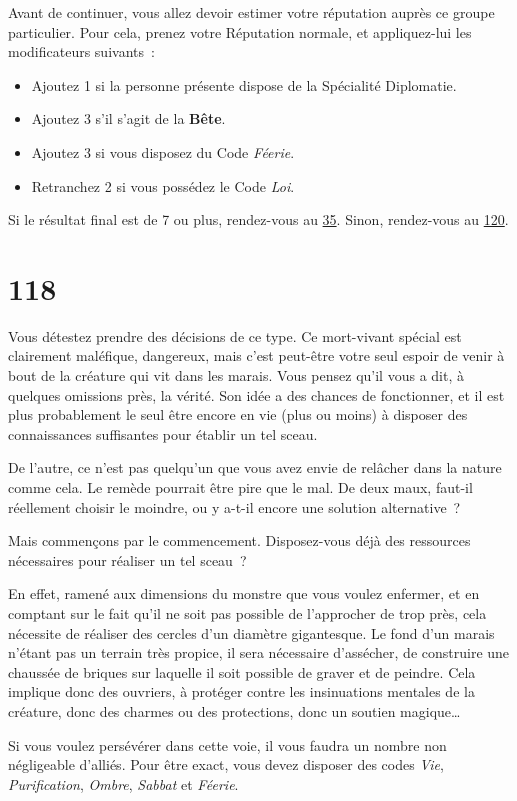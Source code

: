 \documentclass{report}
\newcommand{\gsection}[1]{
    \section{#1}
    \label{section-#1}
}
\newcommand{\glink}[1]{\hyperref[section-#1]{#1}}
\newcommand{\hero}[1]{\textbf{#1}}
\begin{document}
Avant de continuer, vous allez devoir estimer votre réputation auprès ce groupe particulier. Pour cela, prenez votre Réputation normale, et appliquez-lui les modificateurs suivants :
\begin{itemize}
\item Ajoutez 1 si la personne présente dispose de la Spécialité Diplomatie.
\item Ajoutez 3 s'il s'agit de la \hero{Bête}.
\item Ajoutez 3 si vous disposez du Code \emph{Féerie}.
\item Retranchez 2 si vous possédez le Code \emph{Loi}.
\end{itemize}

Si le résultat final est de 7 ou plus, rendez-vous au \glink{35}. Sinon, rendez-vous au \glink{120}.

\gsection{118}

Vous détestez prendre des décisions de ce type. Ce mort-vivant spécial est clairement maléfique, dangereux, mais c'est peut-être votre seul espoir de venir à bout de la créature qui vit dans les marais. Vous pensez qu'il vous a dit, à quelques omissions près, la vérité. Son idée a des chances de fonctionner, et il est plus probablement le seul être encore en vie (plus ou moins) à disposer des connaissances suffisantes pour établir un tel sceau.

De l'autre, ce n'est pas quelqu'un que vous avez envie de relâcher dans la nature comme cela. Le remède pourrait être pire que le mal. De deux maux, faut-il réellement choisir le moindre, ou y a-t-il encore une solution alternative ?

Mais commençons par le commencement. Disposez-vous déjà des ressources nécessaires pour réaliser un tel sceau ?

En effet, ramené aux dimensions du monstre que vous voulez enfermer, et en comptant sur le fait qu'il ne soit pas possible de l'approcher de trop près, cela nécessite de réaliser des cercles d'un diamètre gigantesque. Le fond d'un marais n'étant pas un terrain très propice, il sera nécessaire d'assécher, de construire une chaussée de briques sur laquelle il soit possible de graver et de peindre. Cela implique donc des ouvriers, à protéger contre les insinuations mentales de la créature, donc des charmes ou des protections, donc un soutien magique\dots

Si vous voulez persévérer dans cette voie, il vous faudra un nombre non négligeable d'alliés. Pour être exact, vous devez disposer des codes \emph{Vie}, \emph{Purification}, \emph{Ombre}, \emph{Sabbat} et \emph{Féerie}.
\end{document}
